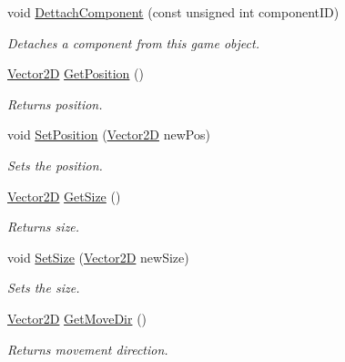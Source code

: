 \begin{DoxyCompactItemize}
void \mbox{\hyperlink{class_game_object_a4d100b6ecc6476f52c72f0889e6c06d4}{Dettach\+Component}} (const unsigned int component\+ID)
\begin{DoxyCompactList}\small\item\em Detaches a component from this game object. \end{DoxyCompactList}\item 
\mbox{\label{class_game_object_a44d7b100b46dafcfe895baf15ee39eff}} 
\mbox{\hyperlink{struct_vector2_d}{Vector2D}} \mbox{\hyperlink{class_game_object_a44d7b100b46dafcfe895baf15ee39eff}{Get\+Position}} ()
\begin{DoxyCompactList}\small\item\em Returns position. \end{DoxyCompactList}\item 
void \mbox{\hyperlink{class_game_object_a0c213e4df823a0f68cf8906a6937f88e}{Set\+Position}} (\mbox{\hyperlink{struct_vector2_d}{Vector2D}} new\+Pos)
\begin{DoxyCompactList}\small\item\em Sets the position. \end{DoxyCompactList}\item 
\mbox{\label{class_game_object_a71e9fe489b7c5ef7e8e0368ec71fac6d}} 
\mbox{\hyperlink{struct_vector2_d}{Vector2D}} \mbox{\hyperlink{class_game_object_a71e9fe489b7c5ef7e8e0368ec71fac6d}{Get\+Size}} ()
\begin{DoxyCompactList}\small\item\em Returns size. \end{DoxyCompactList}\item 
void \mbox{\hyperlink{class_game_object_a67cd10342fab71294976bf7fd5e22e01}{Set\+Size}} (\mbox{\hyperlink{struct_vector2_d}{Vector2D}} new\+Size)
\begin{DoxyCompactList}\small\item\em Sets the size. \end{DoxyCompactList}\item 
\mbox{\label{class_game_object_aac34f983d635994932c3b7a5c4e3e49a}} 
\mbox{\hyperlink{struct_vector2_d}{Vector2D}} \mbox{\hyperlink{class_game_object_aac34f983d635994932c3b7a5c4e3e49a}{Get\+Move\+Dir}} ()
\begin{DoxyCompactList}\small\item\em Returns movement direction. \end{DoxyCompactList}\item 

\end{DoxyCompactItemize}
